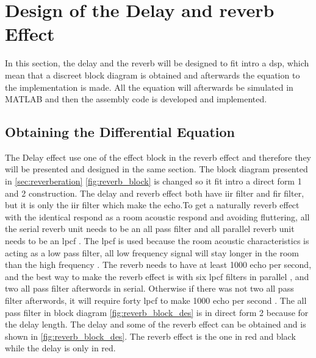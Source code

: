 \section{Design of the Delay and \gls{reverb} Effect}
In this section, the delay and the \gls{reverb} will be designed to fit intro a \gls{dsp}, which mean that a discreet block diagram is obtained and afterwards the equation to the implementation is made. All the equation will afterwards be simulated in MATLAB and then the assembly code is developed and implemented. 


\subsection{Obtaining the Differential Equation}
The Delay effect use one of the effect block in the \gls{reverb} effect and therefore they will be presented and designed in the same section. The block diagram presented in \autoref{sec:reverberation} \autoref{fig:reverb_block} is changed so it fit intro a direct form 1 and 2 construction. 
The delay and \gls{reverb} effect both have \gls{iir} filter and \gls{fir} filter, but it is only the \gls{iir} filter which make the echo.To get a naturally \gls{reverb} effect with the identical respond as a room acoustic respond and avoiding fluttering, all the serial \gls{reverb} unit needs to be an all pass filter and all parallel \gls{reverb} unit needs to be an \gls{lpcf} \citep{LPCF}. The \gls{lpcf} is used because the room acoustic characteristics is acting as a low pass filter, all low frequency signal will stay longer in the room than the high frequency \citep{rfi}. The \gls{reverb} needs to have at least 1000 echo per second, and the best way to make the \gls{reverb} effect is with six \gls{lpcf} filters in parallel \citep{DAFX}, and two all pass filter afterwords in serial. Otherwise if there was not two all pass filter afterwords, it will require forty \gls{lpcf} to make 1000 echo per second \citep{natural_sounding_revorb}. The all pass filter in block diagram \autoref{fig:reverb_block_des} is in direct form 2 because for the delay length. The delay and some of the \gls{reverb} effect can be obtained and is shown in \autoref{fig:reverb_block_des}. The \gls{reverb} effect is the one in red and black while the delay is only in red. 

\newpage

